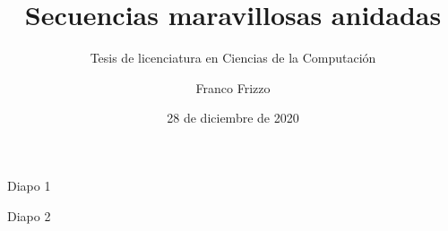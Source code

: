 \documentclass[hexcolor=61b15a]{ff-slides}
\title{Secuencias maravillosas anidadas}
\subtitle{Tesis de licenciatura en Ciencias de la Computación}
\author{Franco Frizzo}
\institute[DC, FCEyN, UBA]
    {Departamento de Computación, FCEyN, UBA}
\date{28 de diciembre de 2020}
\begin{document}
\frame{\titlepage}


\begin{frame}{Diapo 1}

\end{frame}


\begin{frame}{Diapo 2}

\end{frame}

\end{document}
